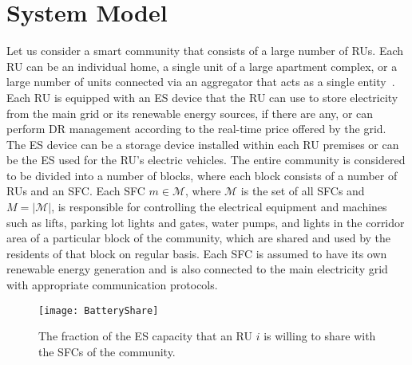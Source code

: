 \documentclass[journal,10pt]{IEEEtran}
\begin{document}
\section{System Model}\label{sec:system-model}
Let us consider a smart community that consists of a large number of RUs. Each RU can be an individual home, a single unit of a large apartment complex, or a large number of units connected via an aggregator that acts as a single entity~\cite{Gkatzikis:2013,Wayes-J-TSG:2012,Tushar-TSG:2013}. Each RU is equipped with an ES device that the RU can use to store electricity from the main grid or its renewable energy sources, if there are any, or can perform DR management according to the real-time price offered by the grid. The ES device can be a storage device installed within each RU premises or can be the ES used for the RU's electric vehicles. The entire community is considered to be divided into a number of blocks, where each block consists of a number of RUs and an SFC. Each SFC $m\in\mathcal{M}$, where $\mathcal{M}$ is the set of all SFCs and $M=|\mathcal{M}|$, is responsible for controlling the electrical equipment and machines such as lifts, parking lot lights and gates, water pumps, and lights in the corridor area of a particular block of the community, which are shared and used by the residents of that block on regular basis. Each SFC is assumed to have its own renewable energy generation and is also connected to the main electricity grid with appropriate communication protocols.
\begin{figure}[t!]
\centering
\texttt{[image: BatteryShare]}
\caption{The fraction of the ES capacity that an RU $i$ is willing to share with the SFCs of the community.} \label{fig:batteryshare}
\end{figure}
\end{document}
